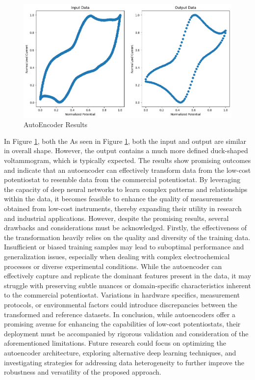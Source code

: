 \begin{figure}[h!]
  \centering
    \includegraphics[width=1\textwidth]{figures/autoencoder.png}
    \caption{AutoEncoder Results}
    \label{autoncoder_results}
\end{figure}
In Figure \ref{autoncoder_results}, both the
As seen in Figure \ref{autoncoder_results}, both the input and output are similar in overall shape. However, the output contains a much more defined duck-shaped voltammogram, which is typically expected. The results show promising outcomes and indicate that an autoencoder can effectively transform data from the low-cost potentiostat to resemble data from the commercial potentiostat. By leveraging the capacity of deep neural networks to learn complex patterns and relationships within the data, it becomes feasible to enhance the quality of measurements obtained from low-cost instruments, thereby expanding their utility in research and industrial applications.
However, despite the promising results, several drawbacks and considerations must be acknowledged. Firstly, the effectiveness of the transformation heavily relies on the quality and diversity of the training data. Insufficient or biased training samples may lead to suboptimal performance and generalization issues, especially when dealing with complex electrochemical processes or diverse experimental conditions. While the autoencoder can effectively capture and replicate the dominant features present in the data, it may struggle with preserving subtle nuances or domain-specific characteristics inherent to the commercial potentiostat. Variations in hardware specifics, measurement protocols, or environmental factors could introduce discrepancies between the transformed and reference datasets. 
In conclusion, while autoencoders offer a promising avenue for enhancing the capabilities of low-cost potentiostats, their deployment must be accompanied by rigorous validation and consideration of the aforementioned limitations. Future research could focus on optimizing the autoencoder architecture, exploring alternative deep learning techniques, and investigating strategies for addressing data heterogeneity to further improve the robustness and versatility of the proposed approach.
